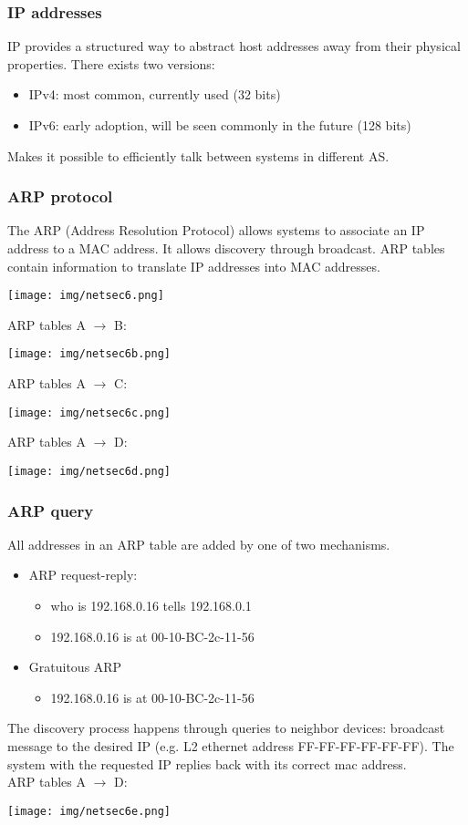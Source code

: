 \documentclass[a4paper, 10pt, titlepage]{article}
\begin{document}
\subsubsection*{IP addresses}
IP provides a structured way to abstract host addresses away from their physical properties. There exists two versions:
\begin{itemize}
\item IPv4: most common, currently used (32 bits)
\item IPv6: early adoption, will be seen commonly in the future (128 bits)
\end{itemize}
Makes it possible to efficiently talk between systems in different AS.

\subsubsection*{ARP protocol}
The ARP (Address Resolution Protocol) allows systems to associate an IP address to a MAC address. It allows discovery through broadcast. ARP tables contain information to translate IP addresses into MAC addresses.
\begin{center}
	\texttt{[image: img/netsec6.png]}
\end{center}
ARP tables A $\rightarrow$ B:
\begin{center}
	\texttt{[image: img/netsec6b.png]}
\end{center}
ARP tables A $\rightarrow$ C:
\begin{center}
	\texttt{[image: img/netsec6c.png]}
\end{center}
ARP tables A $\rightarrow$ D:
\begin{center}
	\texttt{[image: img/netsec6d.png]}
\end{center}

\subsubsection*{ARP query}
All addresses in an ARP table are added by one of two mechanisms.
\begin{itemize}
\item ARP request-reply:
\begin{itemize}
\item who is 192.168.0.16 tells 192.168.0.1
\item 192.168.0.16 is at 00-10-BC-2c-11-56
\end{itemize}
\item Gratuitous ARP
\begin{itemize}
\item 192.168.0.16 is at 00-10-BC-2c-11-56
\end{itemize}
\end{itemize}
The discovery process happens through queries to neighbor devices: broadcast message to the desired IP (e.g. L2 ethernet address FF-FF-FF-FF-FF-FF). The system with the requested IP replies back with its correct mac address. \medskip\\
ARP tables A $\rightarrow$ D:
\begin{center}
	\texttt{[image: img/netsec6e.png]}
\end{center}
\end{document}
